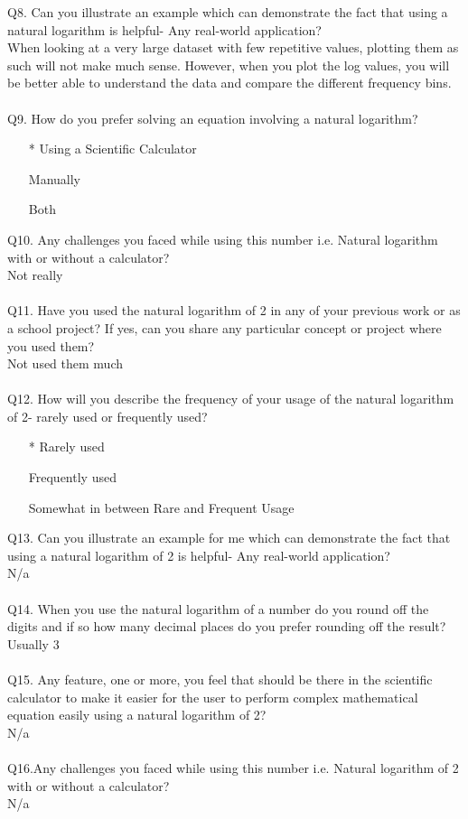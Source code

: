\documentclass{article}
\makeatletter
\newcommand*{\radiobutton}{%
  \@ifstar{\@radiobutton0}{\@radiobutton1}%
}
\newcommand*{\@radiobutton}[1]{%
  \begin{tikzpicture}
    \pgfmathsetlengthmacro\radius{height("X")/2}
    \draw[radius=\radius] circle;
    \ifcase#1 \fill[radius=.6*\radius] circle;\fi
  \end{tikzpicture}%
}
\makeatother
\begin{document}
Q8. Can you illustrate an example which can demonstrate the fact that using a natural logarithm is helpful- Any real-world application?\\
When looking at a very large dataset with few repetitive values, plotting them as such will not make much sense. However, when you plot the log values, you will be better able to understand the data and compare the different frequency bins.\\\\
Q9. How do you prefer solving an equation involving a natural logarithm?
\begin{itemize}
\item[\radiobutton*] Using a Scientific Calculator
\item[\radiobutton] Manually
\item[\radiobutton] Both
\end{itemize}
Q10. Any challenges you faced while using this number i.e. Natural logarithm with or without a calculator?\\
Not really\\\\
Q11. Have you used the natural logarithm of 2 in any of your previous work or as a school project? If yes, can you share any particular concept or project where you used them?\\
Not used them much\\\\
Q12. How will you describe the frequency of your usage of the natural logarithm of 2- rarely used or frequently used?
\begin{itemize}
\item[\radiobutton*] Rarely used
\item[\radiobutton] Frequently used
\item[\radiobutton] Somewhat in between Rare and Frequent Usage
\end{itemize}
Q13. Can you illustrate an example for me which can demonstrate the fact that using a natural logarithm of 2 is helpful- Any real-world application?\\
N/a\\\\
Q14. When you use the natural logarithm of a number do you round off the digits and if so how many decimal places do you prefer rounding off the result? \\
Usually 3\\\\
Q15. Any feature, one or more, you feel that should be there in the scientific calculator to make it easier for the user to perform complex mathematical equation easily using a natural logarithm of 2?\\
N/a\\\\
Q16.Any challenges you faced while using this number i.e. Natural logarithm of 2 with or without a calculator?\\
N/a\\\\
\end{document}
